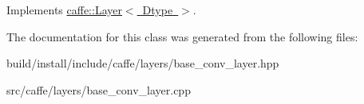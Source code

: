 Implements \mbox{\hyperlink{classcaffe_1_1_layer_a7fe981e8af8d93d587acf2a952be563d}{caffe\+::\+Layer$<$ Dtype $>$}}.



The documentation for this class was generated from the following files\+:\begin{DoxyCompactItemize}
\item 
build/install/include/caffe/layers/base\+\_\+conv\+\_\+layer.\+hpp\item 
src/caffe/layers/base\+\_\+conv\+\_\+layer.\+cpp\end{DoxyCompactItemize}
